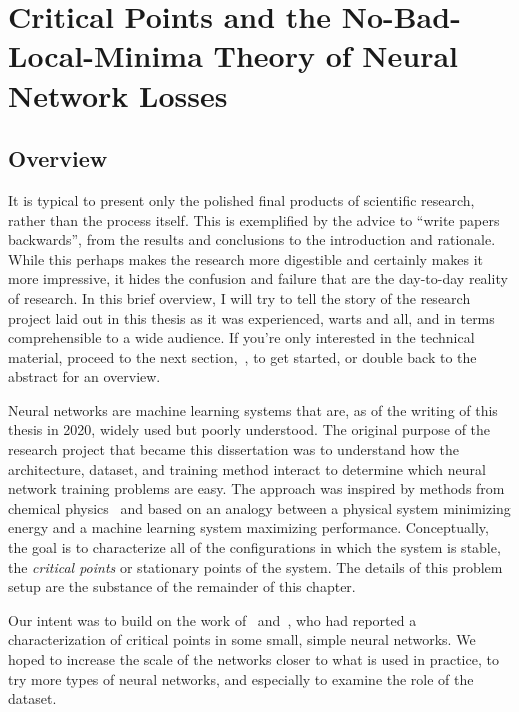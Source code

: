\documentclass[../../thesis.tex]{subfiles}
\begin{document}
\chapter{Critical Points and the No-Bad-Local-Minima Theory of Neural Network Losses}
\onlyinsubfile{\begin{KeepFromToc}
		\tableofcontents
		\clearpage
		\listoffigures
		\listoftables
	\end{KeepFromToc}}
\onlyinsubfile{\clearpage}
\onlyinsubfile{\linenumbers}

\section{Overview}

It is typical to present only the polished final
products of scientific research,
rather than the process itself.
This is exemplified by the advice to
\enquote{write papers backwards},
from the results and conclusions to the introduction and rationale.
While this perhaps makes the research more digestible and
certainly makes it more impressive,
it hides the confusion and failure
that are the day-to-day reality of research.
In this brief overview,
I will try to tell the story of the research project
laid out in this thesis as it was experienced,
warts and all,
and in terms comprehensible to a wide audience.
If you're only interested in the technical material,
proceed to the next section,~,
to get started,
or double back to the abstract for an overview.

Neural networks are machine learning systems
that are, as of the writing of this thesis in 2020,
widely used but poorly understood.
The original purpose of the research project
that became this dissertation was to
understand how the
architecture, dataset, and training method
interact to determine which neural network training problems
are easy.
The approach was inspired by methods from chemical physics~\cite{ballard2017}
and based on an analogy between a physical system minimizing energy
and a machine learning system maximizing performance.
Conceptually, the goal is to characterize all of the configurations
in which the system is stable,
the \emph{critical points} or stationary points
of the system.
The details of this problem setup are the substance
of the remainder of this chapter.

Our intent was to build on the work
of~\cite{dauphin2014} and~\cite{pennington2017},
who had reported a characterization of critical points in
some small, simple neural networks.
We hoped to increase the scale of the networks
closer to what is used in practice,
to try more types of neural networks,
and especially to examine the role of the dataset.
\end{document}
